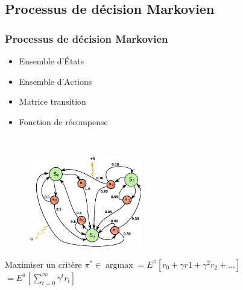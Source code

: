 

\subsection{Processus de décision Markovien}

\begin{frame}
 \frametitle{Processus de décision Markovien}

 


  \begin{minipage}{0.5\textwidth}
 \begin{flushleft}
 \begin{itemize}
  \item Ensemble d'États
  \item Ensemble d'Actions
  \item Matrice transition
  \item Fonction de récompense
 \end{itemize}
  \end{flushleft}
 \end{minipage}
 ~
 \begin{minipage}{0.4\textwidth}
 \begin{flushright}
  \begin{figure}
      \includegraphics[height=4cm]{images/MDP.png} \\
  \end{figure}
  \end{flushright}
 \end{minipage}
 
 
  Maximiser un critère $ \pi^* \in \operatorname{argmax} = E^{\pi}[r_0 + {\gamma}r1 + {\gamma}^2r_2 + ... ]$
  \newline \hspace*{5.6cm}$ = E^{\pi}[ \sum \limits_{t=0}^\infty {\gamma}^tr_t]$
 
\end{frame}


